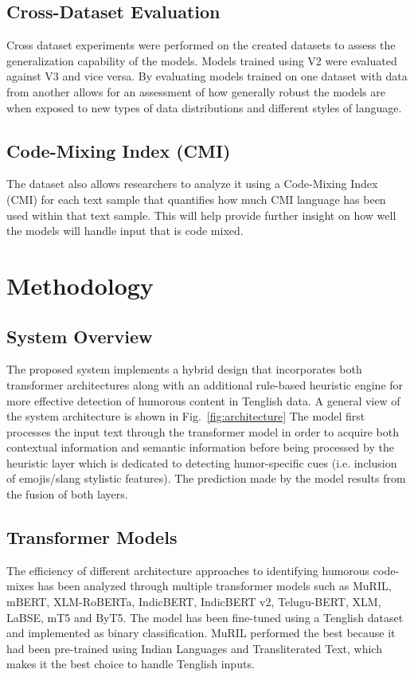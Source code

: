 \documentclass[conference]{IEEEtran}
\begin{document}
\subsection{Cross-Dataset Evaluation}
Cross dataset experiments were performed on the created datasets to assess the generalization capability of the models. Models trained using V2 were evaluated against V3 and vice versa. By evaluating models trained on one dataset with data from another allows for an assessment of how generally robust the models are when exposed to new types of data distributions and different styles of language.

\subsection{Code-Mixing Index (CMI)}
The dataset also allows researchers to analyze it using a Code-Mixing Index (CMI) for each text sample that quantifies how much CMI language has been used within that text sample. This will help provide further insight on how well the models will handle input that is code mixed.

\section{Methodology}

\subsection{System Overview}
The proposed system implements a hybrid design that incorporates both transformer architectures along with an additional rule-based heuristic engine for more effective detection of humorous content in Tenglish data. A general view of the system architecture is shown in Fig.~\ref{fig:architecture} The model first processes the input text through the transformer model in order to acquire both contextual information and semantic information before being processed by the heuristic layer which is dedicated to detecting humor-specific cues (i.e. inclusion of emojis/slang stylistic features). The prediction made by the model results from the fusion of both layers.

\subsection{Transformer Models}
The efficiency of different architecture approaches to identifying humorous code-mixes has been analyzed through multiple transformer models such as MuRIL, mBERT, XLM-RoBERTa, IndicBERT, IndicBERT v2, Telugu-BERT, XLM, LaBSE, mT5 and ByT5. The model has been fine-tuned using a Tenglish dataset and implemented as binary classification. MuRIL performed the best because it had been pre-trained using Indian Languages and Transliterated Text, which makes it the best choice to handle Tenglish inputs.
\end{document}

